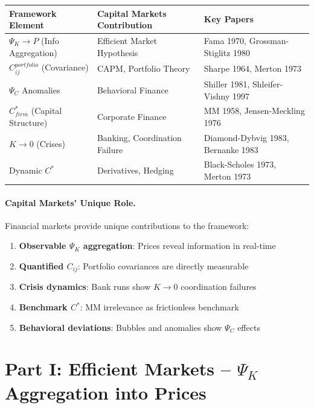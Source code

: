 \begin{center}
\renewcommand{\arraystretch}{1.4}
\begin{tabular}{|l|l|l|}
\hline
\textbf{Framework Element} & \textbf{Capital Markets Contribution} & \textbf{Key Papers} \\
\hline
$\Psi_K \to P$ (Info Aggregation) & Efficient Market Hypothesis & Fama 1970, Grossman-Stiglitz 1980 \\
$C_{ij}^{portfolio}$ (Covariance) & CAPM, Portfolio Theory & Sharpe 1964, Merton 1973 \\
$\Psi_C$ Anomalies & Behavioral Finance & Shiller 1981, Shleifer-Vishny 1997 \\
$C^*_{firm}$ (Capital Structure) & Corporate Finance & MM 1958, Jensen-Meckling 1976 \\
$K \to 0$ (Crises) & Banking, Coordination Failure & Diamond-Dybvig 1983, Bernanke 1983 \\
Dynamic $C^*$ & Derivatives, Hedging & Black-Scholes 1973, Merton 1973 \\
\hline
\end{tabular}
\end{center}

\paragraph{Capital Markets' Unique Role.}
Financial markets provide unique contributions to the framework:
\begin{enumerate}
    \item \textbf{Observable $\Psi_K$ aggregation}: Prices reveal information in real-time
    \item \textbf{Quantified $C_{ij}$}: Portfolio covariances are directly measurable
    \item \textbf{Crisis dynamics}: Bank runs show $K \to 0$ coordination failures
    \item \textbf{Benchmark $C^*$}: MM irrelevance as frictionless benchmark
    \item \textbf{Behavioral deviations}: Bubbles and anomalies show $\Psi_C$ effects
\end{enumerate}


\section{Part I: Efficient Markets -- $\Psi_K$ Aggregation into Prices}
\label{sec:Y-efficient-markets}

